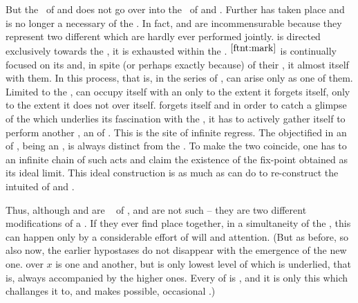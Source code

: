 But the \equin\ of  and  does not go over
into the \equin\ of  and . Further
 has taken place and  is no longer a
necessary  of the . In fact,  and
 are incommensurable because they represent two different
 which are hardly ever performed jointly.   is
directed exclusively towards the , it is exhausted within the
\hoa.  $^{\ref{ftnt:mark}}$  is
continually focused on its  and, in spite (or perhaps exactly
because) of their , it
almost  itself with them.  In this process, that is, in the
series of ,  can
arise only as one of them.  Limited to the \hoa,  can occupy
itself with an  only to the extent it forgets itself, only to the
extent it does not  over itself.   forgets itself and
in order to catch a glimpse of the  which underlies its
fascination with the , it has to actively gather itself to perform
another , an  of .  This is the site of
infinite regress. The  {objectified} in an  of
, being an , is always distinct from the
. To make the two coincide, one has to  an
infinite chain of such acts and claim the existence of the fix-point obtained as
its ideal limit. This ideal construction is as much as
 can do to re-construct the intuited  of
 and .

Thus, although  and  are \equi\  of ,  and  are not such
 -- they are two different modifications of a .
If they ever find place together, in a simultaneity of the \hoa, this can happen
only by a considerable effort of will and attention. (But as before, so also
now, the earlier hypostases do not disappear with the emergence of the new one.
 over $x$ is one  and  another, but
 is only lowest level of  which is underlied, that
is, always accompanied by the higher ones. Every  of  is
, and it is only this  which challanges it to,
and makes possible, occasional .)

